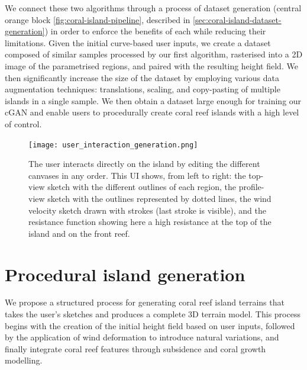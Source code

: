 We connect these two algorithms through a process of dataset generation (central orange block \cref{fig:coral-island-pipeline}, described in \cref{sec:coral-island-dataset-generation}) in order to enforce the benefits of each while reducing their limitations. Given the initial curve-based user inputs, we create a dataset composed of similar samples processed by our first algorithm, rasterised into a 2D image of the parametrised regions, and paired with the resulting height field. We then significantly increase the size of the dataset by employing various data augmentation techniques: translations, scaling, and copy-pasting of multiple islands in a single sample. We then obtain a dataset large enough for training our cGAN and enable users to procedurally create coral reef islands with a high level of control.

\begin{figure}
    \texttt{[image: user\_interaction\_generation.png]}
    \caption{The user interacts directly on the island by editing the different canvases in any order. This UI shows, from left to right: the top-view sketch with the different outlines of each region, the profile-view sketch with the outlines represented by dotted lines, the wind velocity sketch drawn with strokes (last stroke is visible), and the resistance function showing here a high resistance at the top of the island and on the front reef.}
    \label{fig:coral-island-wind-from-strokes-interaction}
\end{figure}


























\section{Procedural island generation}
\label{sec:coral-island-example-generation}

We propose a structured process for generating coral reef island terrains that takes the user's sketches and produces a complete 3D terrain model. This process begins with the creation of the initial height field based on user inputs, followed by the application of wind deformation to introduce natural variations, and finally integrate coral reef features through subsidence and coral growth modelling.

